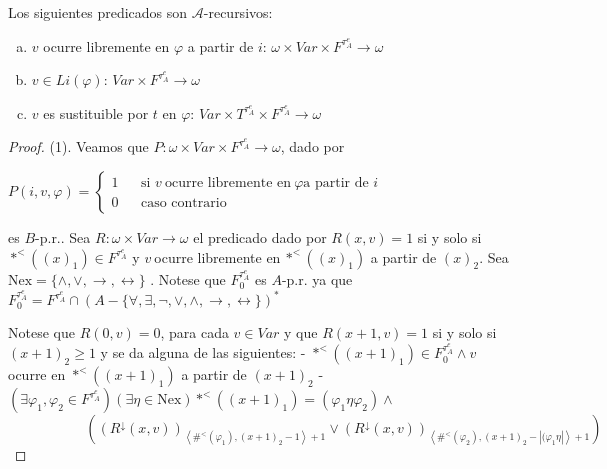   \begin{lemma} \label{lemma_99}
    \PN Los siguientes predicados son $\mathcal{A}$-recursivos:
    \begin{enumerate}[(a)]
      \item \CL $v$ ocurre libremente en $\varphi$ a partir de $i$\CR: $\omega \times Var \times F^{\tau_{A}^{e}}
        \rightarrow \omega$
      \item \CL $v \in Li(\varphi)$\CR: $Var \times F^{\tau_{A}^{e}} \rightarrow \omega$
      \item \CL $v$ es sustituible por $t$ en $\varphi$\CR: $Var \times T^{\tau_{A}^{e}} \times F^{\tau_{A}^{e}}
        \rightarrow \omega$
    \end{enumerate}
  \end{lemma}
  \begin{proof}
    (1). Veamos que $P:\omega \times Var\times F^{\tau_{A}^{e}}\rightarrow \omega $, dado por

    $\displaystyle P(i,v,\varphi )=\left\{ \begin{array}{ccl} 1 & & \text{si }v\mathit{\ }\text{ocurre libremente en}\mathit{\ }\varphi \text{a partir de }i \\ 0 & & \text{caso contrario} \end{array} \right. $

    es $B$-p.r.. Sea $R:\omega \times Var\rightarrow \omega $ el predicado dado por $R(x,v)=1$ si y solo si $\ast ^{< }((x)_{1})\in F^{\tau_{A}^{e}}$ y $v \mathit{\ }$ocurre libremente en$\mathit{\ }\ast ^{< }((x)_{1})$ a partir de $ (x)_{2}$. Sea $\mathrm{Nex}=\{\wedge ,\vee ,\rightarrow ,\leftrightarrow \}$ . Notese que $F_{0}^{\tau_{A}^{e}}$ es $A$-p.r. ya que
    $\displaystyle F_{0}^{\tau_{A}^{e}}=F^{\tau_{A}^{e}}\cap (A-\{\forall ,\exists ,\lnot ,\vee ,\wedge ,\rightarrow ,\leftrightarrow \})^{\ast } $

    Notese que $R(0,v)=0$, para cada $v\in Var$ y que $R(x+1,v)=1$ si y solo si $ (x+1)_{2}\geq 1$ y se da alguna de las siguientes:
    - $\ast ^{< }((x+1)_{1})\in F_{0}^{\tau_{A}^{e}}\wedge v$ ocurre en $ \ast ^{< }((x+1)_{1})$ a partir de $(x+1)_{2}$
    - $(\exists \varphi _{1},\varphi _{2}\in F^{\tau_{A}^{e}})(\exists \eta \in \mathrm{Nex})\ast ^{< }((x+1)_{1})=(\varphi _{1}\eta \varphi _{2})\wedge $
    $\ \ \ \ \ \ \ \ \ \ \ \ \ \ \ \ \ \ \ \ \ \ \ \ \ \left( (R^{\downarrow }(x,v))_{\left\langle \#^{< }(\varphi _{1}),(x+1)_{2}-1\right\rangle +1}\vee (R^{\downarrow }(x,v))_{\left\langle \#^{< }(\varphi _{2}),(x+1)_{2}-\left\vert (\varphi _{1}\eta \right\vert \right\rangle +1}\right) $


\end{proof}
